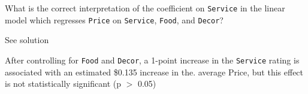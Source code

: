 \documentclass[
  letterpaper,
  DIV=11,
  numbers=noendperiod]{scrartcl}
\begin{document}
\begin{tcolorbox}[enhanced jigsaw, toprule=.15mm, breakable, bottomtitle=1mm, coltitle=black, colback=white, arc=.35mm, left=2mm, leftrule=.75mm, opacitybacktitle=0.6, colframe=quarto-callout-warning-color-frame, colbacktitle=quarto-callout-warning-color!10!white, toptitle=1mm, titlerule=0mm, opacityback=0, title={Task 9}, rightrule=.15mm, bottomrule=.15mm]

What is the correct interpretation of the coefficient on
\texttt{Service} in the linear model which regresses \texttt{Price} on
\texttt{Service}, \texttt{Food}, and \texttt{Decor}?

See solution

After controlling for \texttt{Food} and \texttt{Decor}, a 1-point
increase in the \texttt{Service} rating is associated with an estimated
\$0.135 increase in the. average Price, but this effect is not
statistically significant (p \(>\) 0.05)

\end{tcolorbox}
\end{document}
